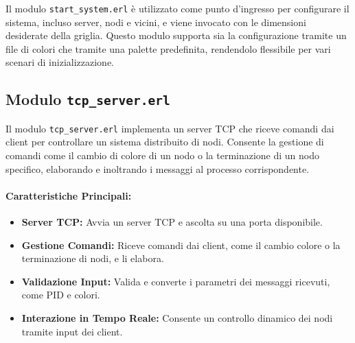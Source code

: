 \documentclass[12pt, a4paper]{report}
\begin{document}
\noindent
Il modulo \texttt{start\_system.erl} è utilizzato come punto d'ingresso per configurare il sistema, incluso server, nodi e vicini, e viene invocato con le dimensioni desiderate della griglia. Questo modulo supporta sia la configurazione tramite un file di colori che tramite una palette predefinita, rendendolo flessibile per vari scenari di inizializzazione.



\subsection{Modulo \texttt{tcp\_server.erl}}

Il modulo \texttt{tcp\_server.erl} implementa un server TCP che riceve comandi dai client per controllare un sistema distribuito di nodi. Consente la gestione di comandi come il cambio di colore di un nodo o la terminazione di un nodo specifico, elaborando e inoltrando i messaggi al processo corrispondente.

\paragraph{Caratteristiche Principali:}
\begin{itemize}
    \item \textbf{Server TCP:} Avvia un server TCP e ascolta su una porta disponibile.
    \item \textbf{Gestione Comandi:} Riceve comandi dai client, come il cambio colore o la terminazione di nodi, e li elabora.
    \item \textbf{Validazione Input:} Valida e converte i parametri dei messaggi ricevuti, come PID e colori.
    \item \textbf{Interazione in Tempo Reale:} Consente un controllo dinamico dei nodi tramite input dei client.
\end{itemize}
\end{document}
